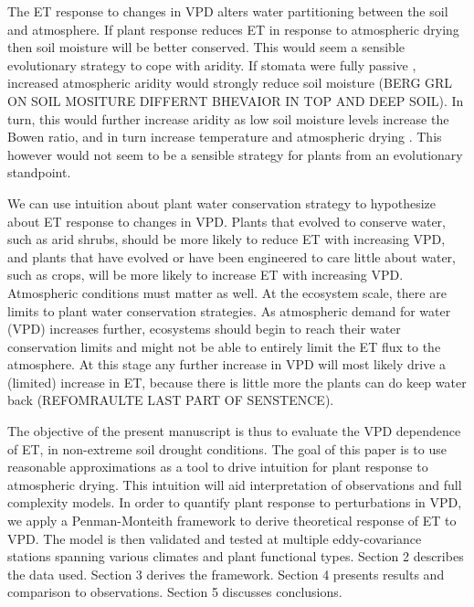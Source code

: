 \documentclass[draft,linenumbers]{agujournal}
\begin{document}
The ET response to changes in VPD alters water partitioning between the soil and atmosphere. If plant response reduces ET in response to atmospheric drying then soil moisture will be better conserved. This would seem a sensible evolutionary strategy to cope with aridity. If stomata were fully passive \citep [similar to soil pores, e.g. ][]{Or_2013}, increased atmospheric aridity would strongly reduce soil moisture (BERG GRL ON SOIL MOSITURE DIFFERNT BHEVAIOR IN TOP AND DEEP SOIL). In turn, this would further increase aridity as low soil moisture levels increase the Bowen ratio, and in turn increase temperature and atmospheric drying \citep[gentine et al. GRL 2016][]{Berg_2016}. This however would not seem to be a sensible strategy for plants from an evolutionary standpoint.

We can use intuition about plant water conservation strategy to hypothesize about ET response to changes in VPD. Plants that evolved to conserve water, such as arid shrubs, should be more likely to reduce ET with increasing VPD, and plants that have evolved or have been engineered to care little about water, such as crops, will be more likely to increase ET with increasing VPD. Atmospheric conditions must matter as well. At the ecosystem scale, there are limits to plant water conservation strategies. As atmospheric demand for water (VPD) increases further, ecosystems should begin to reach their water conservation limits and might not be able to entirely limit the ET flux to the atmosphere. At this stage any further increase in VPD will most likely drive a (limited) increase in ET, because there is little more the plants can do keep water back (REFOMRAULTE LAST PART OF SENSTENCE). 

The objective of the present manuscript is thus to evaluate the VPD dependence of ET, in non-extreme soil drought conditions. The goal of this paper is to use reasonable approximations as a tool to drive intuition for plant response to atmospheric drying. This intuition will aid interpretation of observations and full complexity models. In order to quantify plant response to perturbations in VPD, we apply a Penman-Monteith framework to derive theoretical response of ET to VPD. The model is then validated and tested at multiple eddy-covariance stations spanning various climates and plant functional types. Section 2 describes the data used. Section 3 derives the framework. Section 4 presents results and comparison to observations. Section 5 discusses conclusions. 
\end{document}
